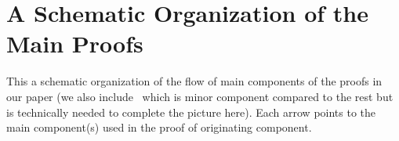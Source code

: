 \documentclass[11pt]{article}
\theoremstyle{definition}
\begin{document}
\clearpage


\section{A Schematic Organization of the Main Proofs}\label{sec:schematic-org}

This a schematic organization of the flow of main components of the proofs in our paper (we also include~ which is minor component compared to the rest but is technically needed
to complete the picture here). Each arrow points to the main component(s) used in the proof of originating component. 

\bigskip
\end{document}

